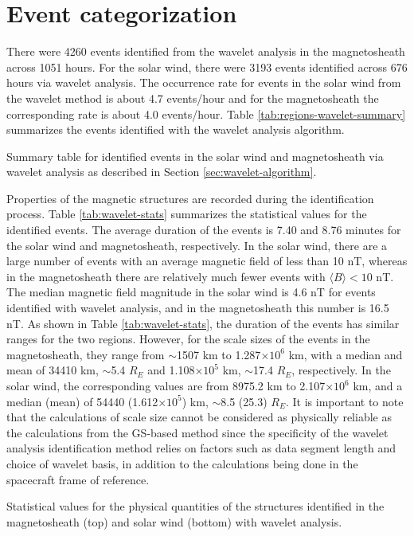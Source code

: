 \section{Event categorization}\label{sec:wavelet-results}
There were 4260 events identified from the wavelet analysis in the magnetosheath across 1051 hours. For the solar wind, there were 3193 events identified across 676 hours via wavelet analysis. The occurrence rate for events in the solar wind from the wavelet method is about 4.7 events/hour and for the magnetosheath the corresponding rate is about 4.0 events/hour. Table  \ref{tab:regions-wavelet-summary} summarizes the events identified with the wavelet analysis algorithm.
\begin{table}
    \centering
    \caption{Summary table for identified events in the solar wind and magnetosheath via wavelet analysis as described in Section \ref{sec:wavelet-algorithm}.}
    
    \label{tab:regions-wavelet-summary}
\end{table}

Properties of the magnetic structures are recorded during the identification process. Table \ref{tab:wavelet-stats} summarizes the statistical values for the identified events. The average duration of the events is 7.40 and 8.76 minutes for the solar wind and magnetosheath, respectively. In the solar wind, there are a large number of events with an average magnetic field of less than 10 nT, whereas in the magnetosheath there are relatively much fewer events with $\langle B\rangle < 10$ nT. The median magnetic field magnitude in the solar wind is 4.6 nT for events identified with wavelet analysis, and in the magnetosheath this number is 16.5 nT. As shown in Table \ref{tab:wavelet-stats}, the duration of the events has similar ranges for the two regions. However, for the scale sizes of the events in the magnetosheath, they range from $\sim$1507 km to 1.287$\times 10^6$ km, with a median and mean of 34410 km, $\sim$5.4 $R_E$ and 1.108$\times 10^5$ km, $\sim$17.4 $R_E$, respectively. In the solar wind, the corresponding values are from 8975.2 km to 2.107$\times 10^6$ km, and a median (mean) of 54440 (1.612$\times 10^5$) km, $\sim$8.5 (25.3) $R_E$. It is important to note that the calculations of scale size cannot be considered as physically reliable as the calculations from the GS-based method since the specificity of the wavelet analysis identification method relies on factors such as data segment length and choice of wavelet basis, in addition to the calculations being done in the spacecraft frame of reference.
\begin{table}
    \centering
    \caption[Statistical values for the physical quantities of structures identified with wavelet analysis]{Statistical values for the physical quantities of the structures identified in the magnetosheath (top) and solar wind (bottom) with wavelet analysis.}
    
    \label{tab:wavelet-stats}
\end{table}

